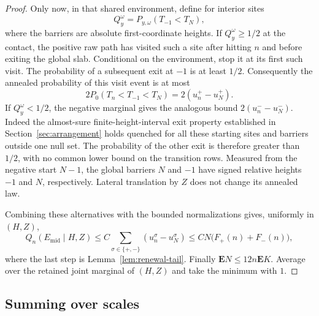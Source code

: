 \begin{proof}
Only now, in that shared environment, define for interior sites
\[
 Q_y^\omega=P_{y,\omega}(T_{-1}<T_N),
\]
where the barriers are absolute first-coordinate heights.  If
$Q_y^\omega\ge1/2$ at the contact, the positive raw path has visited
such a site after hitting $n$ and before exiting the global slab.
Conditional on the environment, stop it at its first such visit.
The probability of a subsequent exit at $-1$ is at least $1/2$.
Consequently the annealed probability of this visit event is at most
\[
 2P_0(T_n<T_{-1}<T_N)=2(u_n^+-u_N^+).
\]
If $Q_y^\omega<1/2$, the negative marginal gives the analogous bound
$2(u_n^--u_N^-)$.  Indeed the almost-sure finite-height-interval
exit property established in Section~\ref{sec:arrangement} holds
quenched for all these starting sites and barriers outside one
null set.  The probability of the other exit is therefore greater
than $1/2$, with no common lower bound on the transition rows.
Measured from the negative start $N-1$, the
global barriers $N$ and $-1$ have signed relative heights $-1$ and
$N$, respectively.  Lateral translation by $Z$ does not change its
annealed law.

Combining these alternatives with the bounded normalizations gives,
uniformly in $(H,Z)$,
\[
 Q_n(E_{\mathrm{mid}}\mid H,Z)
 \le C\sum_{\sigma\in\{+,-\}}(u_n^\sigma-u_N^\sigma)
 \le CN\bigl(F_+(n)+F_-(n)\bigr),
\]
where the last step is Lemma~\ref{lem:renewal-tail}.  Finally
$\mathbf E N\le12n\mathbf E K$.  Average over the retained joint
marginal of $(H,Z)$ and take the minimum with $1$.
\end{proof}

\subsection{Summing over scales}

